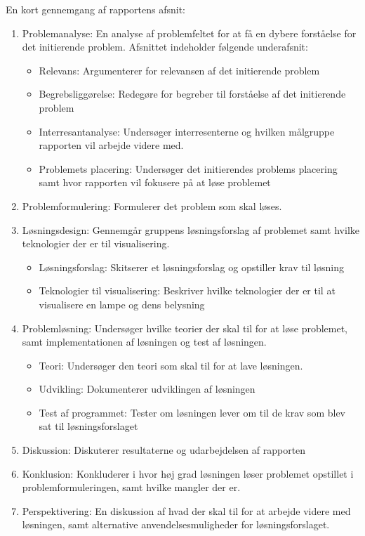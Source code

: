 En kort gennemgang af rapportens afsnit:
\begin{enumerate}
\item Problemanalyse: En analyse af problemfeltet for at få en dybere forståelse for det initierende problem. Afsnittet indeholder følgende underafsnit:
  \begin{itemize}
    \item Relevans: Argumenterer for relevansen af det initierende problem
    \item Begrebsliggørelse: Redegøre for begreber til forståelse af det initierende problem
    \item Interresantanalyse: Undersøger interresenterne og hvilken målgruppe rapporten vil arbejde videre med.
    \item Problemets placering: Undersøger det initierendes problems placering samt hvor rapporten vil fokusere på at løse problemet
  \end{itemize}
\item Problemformulering: Formulerer det problem som skal løses.
\item Løsningsdesign: Gennemgår gruppens løsningsforslag af problemet samt hvilke teknologier der er til visualisering.
  \begin{itemize}
    \item Løsningsforslag: Skitserer et løsningsforslag og opstiller krav til løsning
    \item Teknologier til visualisering: Beskriver hvilke teknologier der er til at visualisere en lampe og dens belysning
  \end{itemize}
\item Problemløsning: Undersøger hvilke teorier der skal til for at løse problemet, samt implementationen af løsningen og test af løsningen.
  \begin{itemize}
    \item Teori: Undersøger den teori som skal til for at lave løsningen.
    \item Udvikling: Dokumenterer udviklingen af løsningen
    \item Test af programmet: Tester om løsningen lever om til de krav som blev sat til løsningsforslaget
  \end{itemize}
\item Diskussion: Diskuterer resultaterne og udarbejdelsen af rapporten
\item Konklusion: Konkluderer i hvor høj grad løsningen løser problemet opstillet i problemformuleringen, samt hvilke mangler der er.
\item Perspektivering: En diskussion af hvad der skal til for at arbejde videre med løsningen, samt alternative anvendelsesmuligheder for løsningsforslaget.
\end{enumerate}


\clearpage